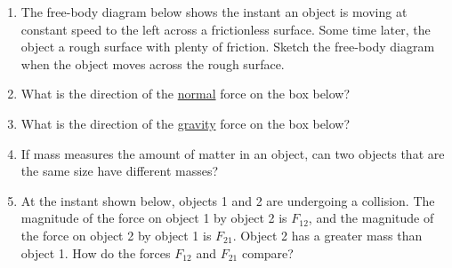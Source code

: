 \documentclass[dvipsnames]{article}
\begin{document}
\begin{enumerate}
\item The free-body diagram below shows the instant an object is moving at constant speed to the left across a frictionless surface. Some time later, the object a rough surface with plenty of friction. Sketch the free-body diagram when the object moves across the rough surface.

\begin{center}
\end{center}

\item What is the direction of the \underline{normal} force on the box below?

\begin{center}
\end{center}

\item What is the direction of the \underline{gravity} force on the box below?

\begin{center}
\end{center}

\item If mass measures the amount of matter in an object, can two objects that are the same size have different masses?

\item At the instant shown below, objects 1 and 2 are undergoing a collision. The magnitude of the force on object 1 by object 2 is $F_{12}$, and the magnitude of the force on object 2 by object 1 is $F_{21}$. Object 2 has a greater mass than object 1. How do the forces $F_{12}$ and $F_{21}$ compare?


\end{enumerate}
\end{document}
